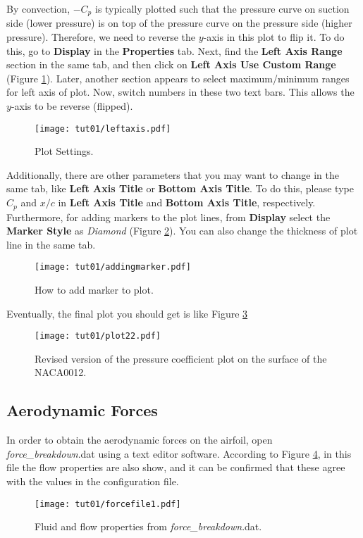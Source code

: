 By convection, $-C_p$ is typically plotted such that the pressure curve on suction side (lower pressure) is on top of the pressure curve on the pressure side (higher pressure). Therefore, we need to reverse the $y$-axis in this plot to flip it. To do this, go to \textbf{Display} in the \textbf{Properties} tab. Next, find the \textbf{Left Axis Range} section in the same tab, and then click on \textbf{Left Axis Use Custom Range} (Figure \ref{fig1:viewsetting}). Later, another section appears to select maximum/minimum ranges for left axis of plot. Now, switch numbers in these two text bars. This allows the $y$-axis to be reverse (flipped).
\begin{figure}[htbp]
    \centering
    \texttt{[image: tut01/leftaxis.pdf]}
    \caption{Plot Settings.}
    \label{fig1:viewsetting}
\end{figure}
Additionally, there are other parameters that you may want to change in the same tab, like \textbf{Left Axis Title} or \textbf{Bottom Axis Title}. To do this, please type $C_p$ and $x/c$ in \textbf{Left Axis Title} and \textbf{Bottom Axis Title}, respectively. Furthermore, for adding markers to the plot lines, from \textbf{Display} select the \textbf{Marker Style} as \textit{Diamond} (Figure \ref{fig1:marker}). You can also change the thickness of plot line in the same tab.
\begin{figure}[htbp]
    \centering
    \texttt{[image: tut01/addingmarker.pdf]}
    \caption{How to add marker to plot.}
    \label{fig1:marker}
\end{figure}
Eventually, the final plot you should get is like Figure \ref{fig1:surface_pressure2}
\begin{figure}[htbp]
    \centering
    \texttt{[image: tut01/plot22.pdf]}
    \caption{Revised version of the pressure coefficient plot on the surface of the NACA0012.}
    \label{fig1:surface_pressure2}
\end{figure}
\subsection{Aerodynamic Forces}
In order to obtain the aerodynamic forces on the airfoil, open \textit{force\_breakdown}.dat using a text editor software. According to Figure \ref{fig1:forcefile1}, in this file the flow properties are also show, and it can be confirmed that these agree with the values in the configuration file. 
\begin{figure}[htbp]
    \centering
    \texttt{[image: tut01/forcefile1.pdf]}
    \caption{Fluid and flow properties from \textit{force\_breakdown}.dat.}
    \label{fig1:forcefile1}
\end{figure}


